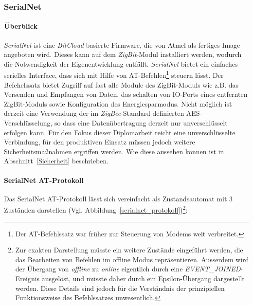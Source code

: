         \subsubsection{SerialNet}

            \paragraph{Überblick}

                \emph{SerialNet} ist eine \emph{BitCloud} basierte Firmware, die von Atmel als fertiges Image angeboten
                wird. Dieses kann auf dem \emph{ZigBit}-Modul installiert werden, wodurch die Notwendigkeit der 
                Eigenentwicklung entfällt. \emph{SerialNet} bietet ein einfaches serielles Interface, dass sich mit
                Hilfe von AT-Befehlen\footnote{Der AT-Befehlssatz war früher zur Steuerung von Modems weit verbreitet.} 
                steuern lässt. Der Befehelssatz bietet Zugriff auf fast alle Module des ZigBit-Moduls wie z.B. das
                Versenden und Empfangen von Daten, das schalten von IO-Ports eines entfernten ZigBit-Moduls sowie
                Konfiguration des Energiesparmodus. Nicht möglich ist derzeit eine Verwendung der im \emph{ZigBee}-Standard
                definierten AES-Verschlüsselung, so dass eine Datenübertragung derzeit nur unverschlüsselt erfolgen kann.
                Für den Fokus dieser Diplomarbeit reicht eine unverschlüsselte Verbindung, für den produktiven Einsatz
                müssen jedoch weitere Sicherheitsmaßnahmen ergriffen werden. Wie diese aussehen können ist in 
                Abschnitt~\ref{Sicherheit} beschrieben. 

            \paragraph{SerialNet AT-Protokoll}


                Das SerialNet AT-Protokoll lässt sich vereinfacht als Zustandsautomat mit 3 Zuständen darstellen
                (Vgl. Abbildung~\ref{serialnet_protokoll})\footnote{Zur exakten Darstellung müsste ein weitere 
                    Zustände eingeführt werden, die das Bearbeiten von Befehlen im offline Modus repräsentieren. 
                    Ausserdem wird der Übergang von \emph{offline} zu \emph{online} eigentlich durch eine 
                    \emph{EVENT\_JOINED}-Ereignis ausgelöst, und müsste daher durch ein Epsilon-Übergang dargestellt
                    werden. Diese Details sind jedoch für die Verständnis der prinzipiellen Funktionsweise des 
                    Befehlssatzes unwesentlich.}:

